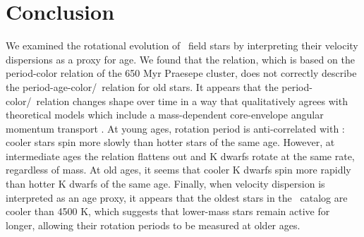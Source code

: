 \section{Conclusion}

We examined the rotational evolution of \kepler\ field stars by interpreting
their velocity dispersions as a proxy for age.
We found that the \citet{angus2019} relation, which is based on the
period-color relation of the 650 Myr Praesepe cluster, does not correctly
describe the period-age-color/\teff\ relation for old stars.
It appears that the period-color/\teff\ relation changes shape over time in a
way that qualitatively agrees with theoretical models which include a
mass-dependent core-envelope angular momentum transport \citep{spada2019}.
At young ages, rotation period is anti-correlated with \teff: cooler stars
spin more slowly than hotter stars of the same age.
However, at intermediate ages the relation flattens out and K dwarfs rotate at
the same rate, regardless of mass.
At old ages, it seems that cooler K dwarfs spin more rapidly than hotter K
dwarfs of the same age.
Finally, when velocity dispersion is interpreted as an age proxy, it appears
that the oldest stars in the \mct\ catalog are cooler than 4500 K, which
suggests that lower-mass stars remain active for longer, allowing their
rotation periods to be measured at older ages.


